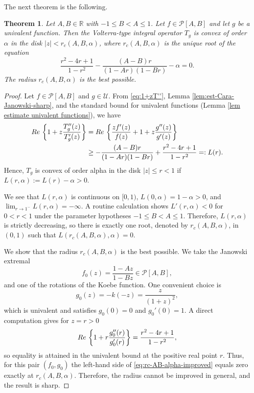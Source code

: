 \documentclass[12pt,a4paper]{amsart}
\numberwithin{equation}{section}
\newtheorem{theorem}{Theorem}[section]
\theoremstyle{remark}
\begin{document}
The next theorem is the following.
\begin{theorem}\label{theorem f P[A,B] g in U sharp}
Let $A,B\in\mathbb{R}$ with $-1\le B<A\le 1$.  
Let $f\in\mathcal{P}[A,B]$ and let $g$ be a univalent function. Then the Volterra-type integral operator $T_g$ is convex of order $\alpha$ in the disk $|z|<r_c(A,B,\alpha)$, where \(r_c(A,B,\alpha)\) is the unique root of the equation
\begin{equation}\label{eq:rc-AB-alpha-improved}
\frac{r^2 - 4r+1}{1-r^2}-\frac{(A-B)r}{(1-A r)(1-B r)}  - \alpha = 0.
\end{equation}
The radius $r_c(A,B,\alpha)$ is the best possible.
\end{theorem}

\begin{proof}
  Let $f\in\mathcal{P}[A,B]$ and $g \in \mathcal{U}$. From \eqref{eq:1+zT''}, Lemma \ref{lem:est-Cara-Janowski-sharp}, and the standard bound for univalent functions (Lemma \ref{lem estimate univalent functions}), we have
  \begin{align*}
    {\rm Re}\,\left\{ 1 + z \frac{T_g''(z)}{T_g'(z)} \right\} 
    &= {\rm Re}\,\left\{ \frac{z f'(z)}{f(z)} + 1 + z \frac{g''(z)}{g'(z)} \right\} \\
    &\geq -\frac{(A-B)r}{(1-A r)(1-B r)}+\frac{r^2-4r+1}{1-r^2}=:L(r).
  \end{align*}
  Hence, $T_g$ is convex of order alpha in the disk $|z| \le r<1$ if $L(r,\alpha):=L(r)-\alpha>0$.

We see that \(L(r,\alpha)\) is continuous on \([0,1)\), \(L(0,\alpha)=1-\alpha>0\), and \(\lim_{r\to1^-}L(r,\alpha)=-\infty\). A routine calculation shows \(L'(r,\alpha)<0\) for \(0<r<1\) under the parameter hypotheses \(-1\le B<A\le1\). Therefore, \(L(r,\alpha)\) is strictly decreasing, so there is exactly one root, denoted by \(r_c(A,B,\alpha)\), in \((0,1)\) such that \(L(r_c(A,B,\alpha),\alpha)=0\).

We show that the radius $r_c(A,B,\alpha)$ is the best possible. We take the Janowski extremal
\[
f_0(z)=\frac{1 - A z}{1 - B z}\in\mathcal P[A,B],
\]
and one of the rotations of the Koebe function. One convenient choice is
\[
g_0(z) = -k(-z) = \frac{z}{(1+z)^2},
\]
which is univalent and satisfies $g_0(0)=0$ and $g_0'(0)=1$.
 A direct computation gives for \(z=r>0\)
\[
{\rm Re}\,\left\{1 + r\frac{g_0''(r)}{g_0'(r)}\right\} = \frac{r^2-4r+1}{1-r^2},
\]
so equality is attained in the univalent bound at the positive real point \(r\).
Thus, for this pair \((f_0,g_0)\) the left-hand side of \eqref{eq:rc-AB-alpha-improved} equals zero exactly at \(r_c(A,B,\alpha)\). Therefore, the radius cannot be improved in general, and the result is sharp.

\end{proof}
\end{document}
